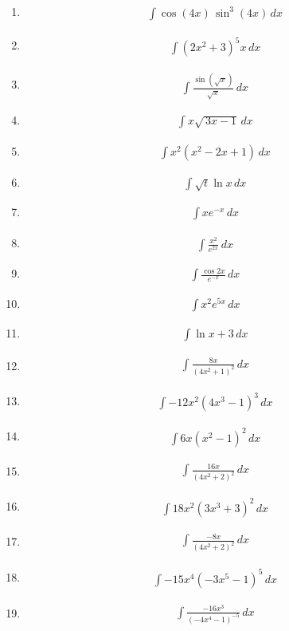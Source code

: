 \documentclass[twoside, fleqn,12pt,letterpaper]{book}
\newcommand{\makeitem}[2]{\item {#2}\begin{align*} {#1}
  \end{align*}}
\begin{document}
\begin{multicols}{2}
\begin{enumerate}
  \makeitem{\int{{\cos \left( {4x} \right)\,{{{\sin }}^{3}}}}\left( {4x} \right)\,dx}{\cite{Prinecton}}
  
  \makeitem{\displaystyle \int{{{{{\left( {2{{x}^{2}}+3} \right)}}^{5}}}}x\,dx}{\cite{Prinecton}}
  
  \makeitem{\displaystyle \int{{\frac{{\sin \left( {\sqrt{x}} \right)}}{{\sqrt{x}}}}}\,dx}{\cite{Prinecton}}
  
  \makeitem{\int{{x\sqrt{{\,3x-1}}}}\,dx}{\cite{Prinecton}}
  
  \makeitem{\displaystyle \int{{{{x}^{2}}\left( {{{x}^{2}}-2x+1} \right)}}\,dx}{\cite{Prinecton}}
  
  \makeitem{\int \sqrt{t}\ln{x} \, dx}{\cite{Prinecton}} 
  
  \makeitem{\int xe^{-x} \, dx}{\cite{Prinecton}} 
  
  \makeitem{\int \frac{x^2}{e^{2x}} \, dx}{\cite{Prinecton}} 
  
  \makeitem{\int \frac{\cos{2x}}{e^{-x}} \, dx}{\cite{Prinecton}}
  
  \makeitem{\int x^2e^{5x} \, dx}{\cite{Prinecton}} 
  
  \makeitem{\int \ln{x+3} \, dx}{\cite{Prinecton}} 
  
  \makeitem{\int \frac{8x}{(4x^2+1)^2} \, dx}{\cite{Prinecton}}
  
  \makeitem{\int -12x^2(4x^3-1)^3 \, dx}{\cite{Prinecton}} 
  
  \makeitem{\int 6x(x^2-1)^2 \, dx}{\cite{Prinecton}} 
  
  \makeitem{\int \frac{16x}{(4x^2+2)^2} \, dx}{\cite{Prinecton}} 
  
  \makeitem{\int 18x^2(3x^3+3)^2 \, dx}{\cite{Prinecton}} 
  
  \makeitem{\int \frac{-8x}{(4x^2+2)^2} \, dx}{\cite{Prinecton}} 
  
  \makeitem{\int -15x^4(-3x^5-1)^5 \, dx}{\cite{Prinecton}} 
  
  \makeitem{\int \frac{-16x^3}{(-4x^4-1)^{-5}} \, dx}{\cite{Prinecton}} 
  
  
  
\end{enumerate}
\end{multicols}



 
\end{document}
